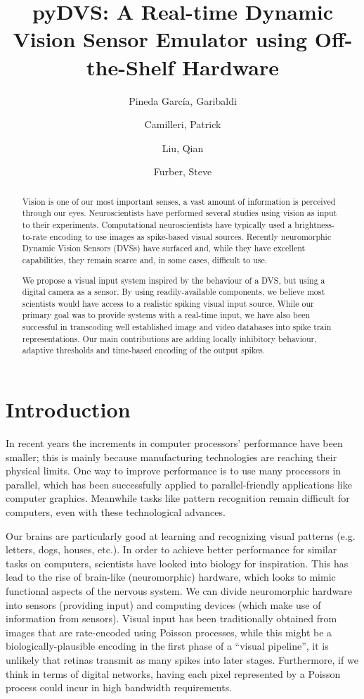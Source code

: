 \documentclass[twocolumn, a4paper]{article}
\title{pyDVS: A Real-time Dynamic Vision Sensor Emulator using Off-the-Shelf Hardware}
\author{Pineda García, Garibaldi \and Camilleri, Patrick \and Liu, Qian \and Furber, Steve}
\begin{document}
\maketitle
\begin{abstract}
\textsf{Vision is one of our most important senses, a vast amount of information is perceived through our eyes. Neuroscientists have performed several studies using vision as input to their experiments. Computational neuroscientists have typically used a brightness-to-rate encoding to use images as spike-based visual sources. Recently neuromorphic Dynamic Vision Sensors (DVSs) have surfaced and, while they have excellent capabilities, they remain scarce and, in some cases, difficult to use.}


\textsf{
We propose a visual input system inspired by the behaviour of a DVS, but using a digital camera as a sensor. By using readily-available components, we believe most scientists would have access to a realistic spiking visual input source. While our primary goal was to provide systems with a real-time input, we have also been successful in transcoding well established image and video databases into spike train representations. Our main contributions are adding locally inhibitory behaviour, adaptive thresholds and time-based encoding of the output spikes.}

\end{abstract}

\section{Introduction}

In recent years the increments in computer processors' performance have been smaller; this is mainly because manufacturing technologies are reaching their physical limits. One way to improve performance is to use many processors in parallel, which has been successfully applied to parallel-friendly applications like computer graphics. Meanwhile tasks like pattern recognition remain difficult for computers, even with these technological advances.

Our brains are particularly good at learning and recognizing visual patterns (e.g. letters, dogs, houses, etc.). In order to achieve better performance for similar tasks on computers, scientists have looked into biology for inspiration. This has lead to the rise of brain-like (neuromorphic) hardware, which looks to mimic functional aspects of the nervous system. We can divide neuromorphic hardware into sensors (providing input) and computing devices (which make use of information from sensors). Visual input has been traditionally obtained from images that are rate-encoded using Poisson processes, while this might be a biologically-plausible encoding in the first phase of a ``visual pipeline'', it is unlikely that retinas transmit as many spikes into later stages. Furthermore, if we think in terms of digital networks, having each pixel represented by a Poisson process could incur in high bandwidth requirements. 
\end{document}
